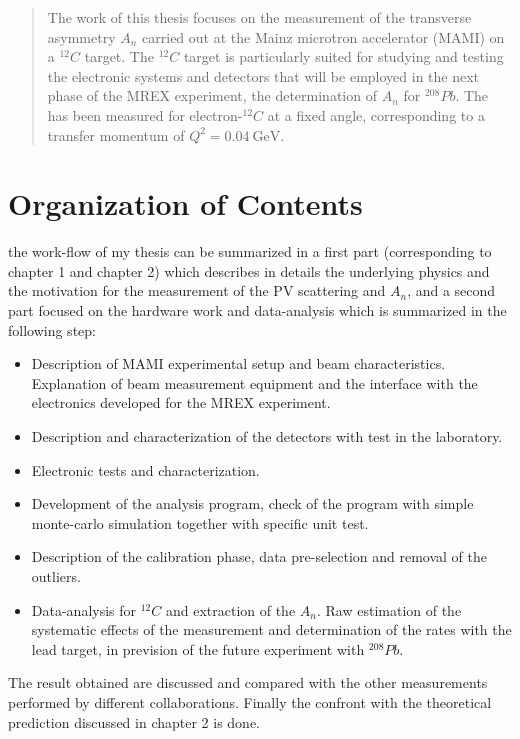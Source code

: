\begin{abstract}
The work of this thesis focuses on the measurement of the transverse asymmetry $A_{n}$ carried out at the Mainz microtron accelerator (MAMI) on a $^{12}C$ target. The $^{12}C$ target is particularly suited for studying and testing the electronic systems and detectors that will be employed in the next phase of the MREX experiment, the determination of $A_{n}$ for $^{208}Pb$. 
The \transv has been measured for electron-$^{12}C$ at a fixed angle, corresponding to a transfer momentum of $Q^{2} = \SI{0.04}{\giga \electronvolt}$. 
\end{abstract}
\newpage
\chapter*{Organization of Contents}

the work-flow of my thesis can be summarized in a first part (corresponding to chapter 1 and chapter 2) which describes in details the underlying physics and the motivation for the measurement of the PV scattering and $A_{n}$, and a second part focused on the hardware work and data-analysis which is summarized in the following step:
\begin{itemize}
\item Description of MAMI experimental setup and beam characteristics. Explanation of beam measurement equipment and the interface with the electronics developed for the MREX experiment.
\item Description and characterization of the detectors with test in the laboratory.
\item Electronic tests and characterization. 
\item Development of the analysis program, check of the program with simple monte-carlo simulation together with specific unit test.
\item Description of the calibration phase, data pre-selection and removal of the outliers.
\item Data-analysis for $^{12}C$ and extraction of the $A_{n}$. Raw estimation of the systematic effects of the measurement and determination of the rates with the lead target, in prevision of the future experiment with $^{208}Pb$.
\end{itemize}

The result obtained are discussed and compared with the other measurements performed by different collaborations. Finally the confront with the theoretical prediction discussed in chapter 2 is done.